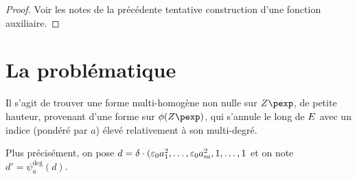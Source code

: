 \begin{proof}
  Voir les notes de la précédente tentative construction d'une fonction
  auxiliaire.
\end{proof}

\section{La problématique}

Il s'agit de trouver une forme multi-homogène non nulle sur $\var$, de petite
hauteur, provenant d'une forme sur $\phi(\var)$, qui s'annule le long de
$E$ avec un indice (pondéré par $a$) élevé relativement à son multi-degré.

Plus précisément, on pose $d = \delta \cdot (\varepsilon_0 a_1^2, \dots, \varepsilon_0
a_m^2, 1, \dots, 1$ et on note $d' = \psi_a^{\deg}(d)$.


